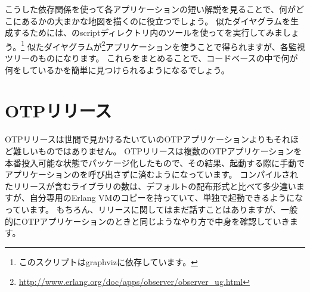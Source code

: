 こうした依存関係を使って各アプリケーションの短い解説を見ることで、何がどこにあるかの大まかな地図を描くのに役立つでしょう。
似たダイヤグラムを生成するためには、のscriptディレクトリ内のツールを使ってを実行してみましょう。\footnote{このスクリプトはgraphvizに依存しています。}
似たダイヤグラムが\footnote{\href{http://www.erlang.org/doc/apps/observer/observer\_ug.html}{http://www.erlang.org/doc/apps/observer/observer\_ug.html}}アプリケーションを使うことで得られますが、各監視ツリーのものになります。
これらをまとめることで、コードベースの中で何が何をしているかを簡単に見つけられるようになるでしょう。

\FloatBarrier

\section{OTPリリース}
\label{sec:dive-otp-releases}

OTPリリースは世間で見かけるたいていのOTPアプリケーションよりもそれほど難しいものではありません。
OTPリリースは複数のOTPアプリケーションを本番投入可能な状態でパッケージ化したもので、その結果、起動する際に手動でアプリケーションのを呼び出さずに済むようになっています。
コンパイルされたリリースが含むライブラリの数は、デフォルトの配布形式と比べて多少違いますが、自分専用のErlang VMのコピーを持っていて、単独で起動できるようになっています。
もちろん、リリースに関してはまだ話すことはありますが、一般的にOTPアプリケーションのときと同じようなやり方で中身を確認していきます。

